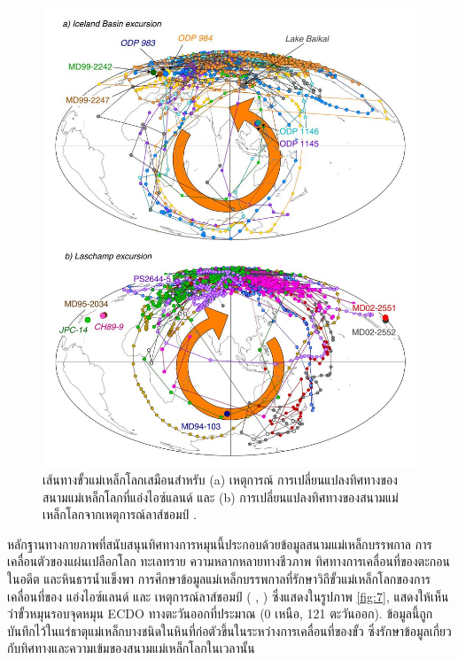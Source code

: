 \documentclass[10pt,twocolumn,letterpaper]{article}
\begin{document}
\begin{figure}[t]
\begin{center}
   \includegraphics[width=0.94\linewidth]{laj.jpg}
\end{center}
   \caption{เส้นทางขั้วแม่เหล็กโลกเสมือนสำหรับ (a) เหตุการณ์ การเปลี่ยนแปลงทิศทางของสนามแม่เหล็กโลกที่แอ่งไอซ์แลนด์  และ (b) การเปลี่ยนแปลงทิศทางของสนามแม่เหล็กโลกจากเหตุการณ์ลาส์ชอมป์ \cite{35}.}
\label{fig:7}
\label{fig:onecol}
\end{figure}

หลักฐานทางกายภาพที่สนับสนุนทิศทางการหมุนนี้ประกอบด้วยข้อมูลสนามแม่เหล็กบรรพกาล การเคลื่อนตัวของแผ่นเปลือกโลก ทะเลทราย ความหลากหลายทางชีวภาพ ทิศทางการเคลื่อนที่ของตะกอนในอดีต และหินธารน้ำแข็งพา 
การศึกษาข้อมูลแม่เหล็กบรรพกาลที่รักษาวิถีขั้วแม่เหล็กโลกของการเคลื่อนที่ของ แอ่งไอซ์แลนด์ และ เหตุการณ์ลาส์ชอมป์ ( \cite{35}, ) ซึ่งแสดงในรูปภาพ \ref{fig:7}, แสดงให้เห็นว่าขั้วหมุนรอบจุดหมุน ECDO ทางตะวันออกที่ประมาณ (0 เหนือ, 121 ตะวันออก). ข้อมูลนี้ถูกบันทึกไว้ในแร่ธาตุแม่เหล็กบางชนิดในหินที่ก่อตัวขึ้นในระหว่างการเคลื่อนที่ของขั้ว ซึ่งรักษาข้อมูลเกี่ยวกับทิศทางและความเข้มของสนามแม่เหล็กโลกในเวลานั้น
\end{document}
